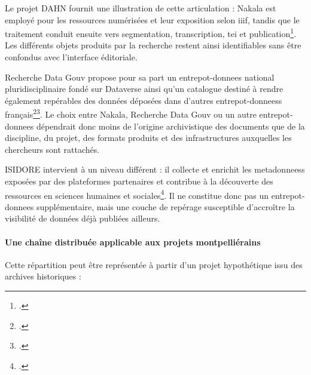 Le projet DAHN fournit une illustration de cette articulation : Nakala est employé pour les ressources numérisées et leur exposition selon \gls{iiif}, tandis que le traitement conduit ensuite vers segmentation, transcription, \gls{tei} et publication\footcite{Chiffoleau2024TEIPipeline}. Les différents objets produits par la recherche restent ainsi identifiables sans être confondus avec l'interface éditoriale.

Recherche Data Gouv propose pour sa part un \gls{entrepot-donnees} national pluridisciplinaire fondé sur Dataverse ainsi qu'un catalogue destiné à rendre également repérables des données déposées dans d'autres \glspl{entrepot-donnees} français\footcite{RechercheDataGouvEntrepot}\footcite{RechercheDataGouvCatalogue}. Le choix entre Nakala, Recherche Data Gouv ou un autre \gls{entrepot-donnees} dépendrait donc moins de l'origine archivistique des documents que de la discipline, du projet, des formats produits et des infrastructures auxquelles les chercheurs sont rattachés.

ISIDORE intervient à un niveau différent : il collecte et enrichit les \glspl{metadonnees} exposées par des plateformes partenaires et contribue à la découverte des ressources en sciences humaines et sociales\footcite{HumaNumIsidore}. Il ne constitue donc pas un \gls{entrepot-donnees} supplémentaire, mais une couche de repérage susceptible d'accroître la visibilité de données déjà publiées ailleurs.

\paragraph{Une chaîne distribuée applicable aux projets montpelliérains}

Cette répartition peut être représentée à partir d'un projet hypothétique issu des archives historiques :

